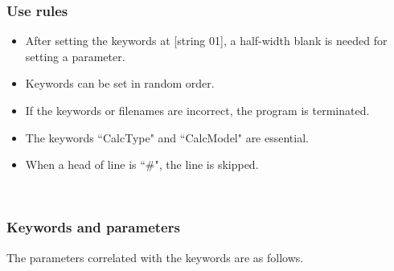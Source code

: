 \subsubsection{Use rules}
\begin{itemize}
\item After setting the keywords at [string 01], a half-width blank is needed for setting a parameter.
\item Keywords can be set in random order.
\item If the keywords or filenames are incorrect, the program is terminated. 
\item The keywords ``CalcType" and ``CalcModel" are essential. 
\item When a head of line is ``$\#$", the line is skipped.
\end{itemize}
~\subsubsection{Keywords and parameters}
The parameters correlated with the keywords are as follows.
